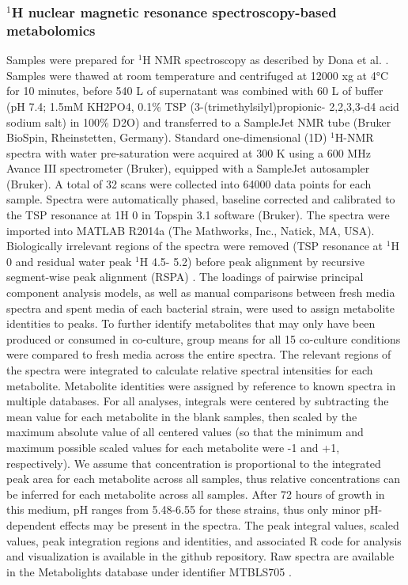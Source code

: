 \documentclass[11pt,twocolumn,notitlepage,openany,twoside]{book}
\begin{document}
\begin{refsection}
\subsubsection{$^1\!$H nuclear magnetic resonance spectroscopy-based metabolomics}

Samples were prepared for $^1\!$H NMR spectroscopy as described by Dona et al. \cite{Dona2014-og}. Samples were thawed at room temperature and centrifuged at 12000 xg at 4°C for 10 minutes, before 540 {\textmu}L of supernatant was combined with 60 {\textmu}L of buffer (pH 7.4; 1.5mM KH2PO4, 0.1\% TSP (3-(trimethylsilyl)propionic- 2,2,3,3-d4 acid sodium salt) in 100\% D2O) and transferred to a SampleJet NMR tube (Bruker BioSpin, Rheinstetten, Germany). Standard one-dimensional (1D) $^1\!$H-NMR spectra with water pre-saturation were acquired at 300 K using a 600 MHz Avance III spectrometer (Bruker), equipped with a SampleJet autosampler (Bruker). A total of 32 scans were collected into 64000 data points for each sample. Spectra were automatically phased, baseline corrected and calibrated to the TSP resonance at {\textdelta}1H 0 in Topspin 3.1 software (Bruker). The spectra were imported into MATLAB R2014a (The Mathworks, Inc., Natick, MA, USA). Biologically irrelevant regions of the spectra were removed (TSP resonance at {\textdelta}$^1\!$H 0 and residual water peak {\textdelta} $^1\!$H 4.5- 5.2) before peak alignment by recursive segment-wise peak alignment (RSPA) \cite{Veselkov2009-ha}. The loadings of pairwise principal component analysis models, as well as manual comparisons between fresh media spectra and spent media of each bacterial strain, were used to assign metabolite identities to peaks. To further identify metabolites that may only have been produced or consumed in co-culture, group means for all 15 co-culture conditions were compared to fresh media across the entire spectra. The relevant regions of the spectra were integrated to calculate relative spectral intensities for each metabolite. Metabolite identities were assigned by reference to known spectra in multiple databases. For all analyses, integrals were centered by subtracting the mean value for each metabolite in the blank samples, then scaled by the maximum absolute value of all centered values (so that the minimum and maximum possible scaled values for each metabolite were -1 and +1, respectively). We assume that concentration is proportional to the integrated peak area for each metabolite across all samples, thus relative concentrations can be inferred for each metabolite across all samples. After 72 hours of growth in this medium, pH ranges from 5.48-6.55 for these strains, thus only minor pH-dependent effects may be present in the spectra. The peak integral values, scaled values, peak integration regions and identities, and associated R code for analysis and visualization is available in the github repository. Raw spectra are available in the Metabolights database under identifier MTBLS705 \cite{Kale2016-aa}.


\end{refsection}
\end{document}
